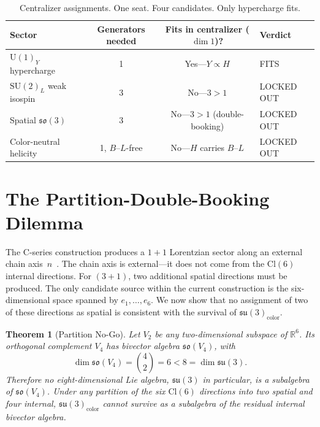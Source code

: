 \documentclass[aip,jmp,amsmath,amssymb,reprint,author-year]{revtex4-2}
\newtheorem{theorem}{Theorem}
\begin{document}
\begin{table}[ht]
\centering
\begin{tabular}{@{}l c c l@{}}
\toprule
Sector & Generators needed &
  Fits in centralizer ($\dim 1$)? & Verdict \\
\midrule
$\mathrm{U}(1)_Y$ hypercharge & 1 &
  Yes---$Y \propto H$ & FITS \\
$\mathrm{SU}(2)_L$ weak isospin & 3 &
  No---$3 > 1$ & LOCKED OUT \\
Spatial $\mathfrak{so}(3)$ & 3 &
  No---$3 > 1$ (double-booking) & LOCKED OUT \\
Color-neutral helicity & 1, $B$--$L$-free &
  No---$H$ carries $B$--$L$ & LOCKED OUT \\
\bottomrule
\end{tabular}
\caption{Centralizer assignments.  One seat.  Four candidates.  Only
  hypercharge fits.}
\label{tab:centralizer-summary}
\end{table}

\section{The Partition-Double-Booking Dilemma}
\label{sec:partition}

The C-series construction produces a $1{+}1$ Lorentzian sector along an
external chain axis~$n$~\citep{C4consolidation}.  The chain axis is
external---it does not come from the $\mathrm{Cl}(6)$ internal
directions.  For $(3{+}1)$, two additional spatial directions must be
produced.  The only candidate source within the current construction is
the six-dimensional space spanned by $e_1, \ldots, e_6$.  We now show
that no assignment of two of these directions as spatial is consistent
with the survival of $\mathfrak{su}(3)_{\mathrm{color}}$.

\begin{theorem}[Partition No-Go]
\label{thm:partition}
Let $V_2$ be any two-dimensional subspace of\/ $\mathbb{R}^6$.  Its
orthogonal complement $V_4$ has bivector algebra $\mathfrak{so}(V_4)$,
with
\begin{equation}
\label{eq:partition-dim}
\dim\mathfrak{so}(V_4) = \binom{4}{2} = 6
  < 8 = \dim\mathfrak{su}(3).
\end{equation}
Therefore no eight-dimensional Lie algebra, $\mathfrak{su}(3)$ in
particular, is a subalgebra of\/ $\mathfrak{so}(V_4)$.  Under any
partition of the six\/ $\mathrm{Cl}(6)$ directions into two spatial and
four internal, $\mathfrak{su}(3)_{\mathrm{color}}$ cannot survive as a
subalgebra of the residual internal bivector algebra.
\end{theorem}
\end{document}
